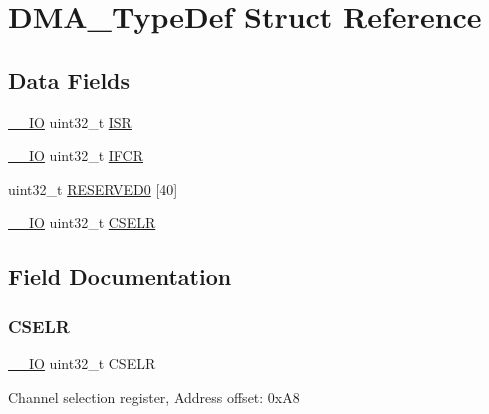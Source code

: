 \hypertarget{struct_d_m_a___type_def}{}\section{D\+M\+A\+\_\+\+Type\+Def Struct Reference}
\label{struct_d_m_a___type_def}
\subsection*{Data Fields}
\begin{DoxyCompactItemize}
\item 
\hyperlink{core__sc300_8h_aec43007d9998a0a0e01faede4133d6be}{\+\_\+\+\_\+\+IO} uint32\+\_\+t \hyperlink{struct_d_m_a___type_def_ab3c49a96815fcbee63d95e1e74f20e75}{I\+SR}
\item 
\hyperlink{core__sc300_8h_aec43007d9998a0a0e01faede4133d6be}{\+\_\+\+\_\+\+IO} uint32\+\_\+t \hyperlink{struct_d_m_a___type_def_ac6f9d540fd6a21c0fbc7bfbbee9a8504}{I\+F\+CR}
\item 
uint32\+\_\+t \hyperlink{struct_d_m_a___type_def_a307990146f8d06c47db79a8ea23c4251}{R\+E\+S\+E\+R\+V\+E\+D0} \mbox{[}40\mbox{]}
\item 
\hyperlink{core__sc300_8h_aec43007d9998a0a0e01faede4133d6be}{\+\_\+\+\_\+\+IO} uint32\+\_\+t \hyperlink{struct_d_m_a___type_def_a8d5130e778eb9b27f300d322abb91aea}{C\+S\+E\+LR}
\end{DoxyCompactItemize}


\subsection{Field Documentation}
\mbox{\label{struct_d_m_a___type_def_a8d5130e778eb9b27f300d322abb91aea}} 
\subsubsection{\texorpdfstring{C\+S\+E\+LR}{CSELR}}
{\footnotesize\ttfamily \hyperlink{core__sc300_8h_aec43007d9998a0a0e01faede4133d6be}{\+\_\+\+\_\+\+IO} uint32\+\_\+t C\+S\+E\+LR}

Channel selection register, Address offset\+: 0x\+A8 \mbox{\label{struct_d_m_a___type_def_ac6f9d540fd6a21c0fbc7bfbbee9a8504}} 
